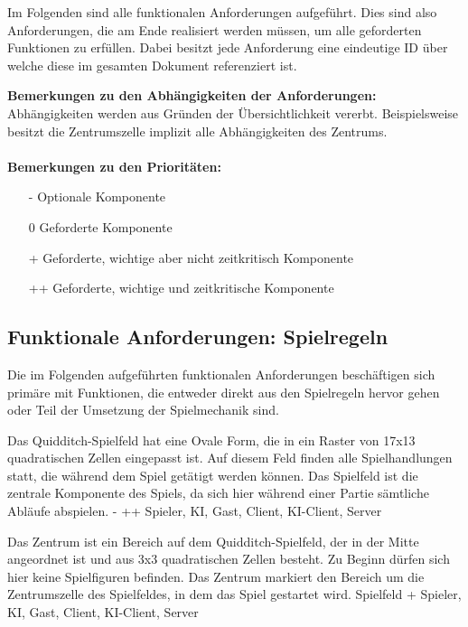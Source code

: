 Im Folgenden sind alle funktionalen Anforderungen aufgeführt. Dies sind also Anforderungen, die am Ende realisiert werden müssen, um alle geforderten Funktionen zu erfüllen. Dabei besitzt jede Anforderung eine eindeutige ID über welche diese im gesamten Dokument referenziert ist.

\textbf{Bemerkungen zu den Abhängigkeiten der Anforderungen:} \\
Abhängigkeiten werden aus Gründen der Übersichtlichkeit vererbt. Beispielsweise besitzt die Zentrumszelle implizit alle Abhängigkeiten des Zentrums.  \\ \\
 \textbf{Bemerkungen zu den Prioritäten:} \\
 \begin{itemize}
    \item[-] Optionale Komponente
    \item[0] Geforderte Komponente
    \item[+] Geforderte, wichtige aber nicht zeitkritisch Komponente
    \item[++] Geforderte, wichtige und zeitkritische Komponente
 \end{itemize}

\subsection{Funktionale Anforderungen: Spielregeln} 

Die im Folgenden aufgeführten funktionalen Anforderungen beschäftigen sich primäre mit Funktionen, die entweder direkt aus den Spielregeln hervor gehen oder Teil der Umsetzung der Spielmechanik sind.

        {Das Quidditch-Spielfeld hat eine Ovale Form, die in ein Raster von 17x13 quadratischen Zellen eingepasst ist. Auf diesem Feld finden alle Spielhandlungen statt, die während dem Spiel getätigt werden können.}
        {Das Spielfeld ist die zentrale Komponente des Spiels, da sich hier während einer Partie sämtliche Abläufe abspielen.}
        {-}
        {++}
        {Spieler, KI, Gast, Client, KI-Client, Server}

        {Das Zentrum ist ein Bereich auf dem Quidditch-Spielfeld, der in der Mitte angeordnet ist und aus 3x3 quadratischen Zellen besteht. Zu Beginn dürfen sich hier keine Spielfiguren befinden.}
        {Das Zentrum markiert den Bereich um die Zentrumszelle des Spielfeldes, in dem das Spiel gestartet wird.}
        {Spielfeld}
        {+}
        {Spieler, KI, Gast, Client, KI-Client, Server}

